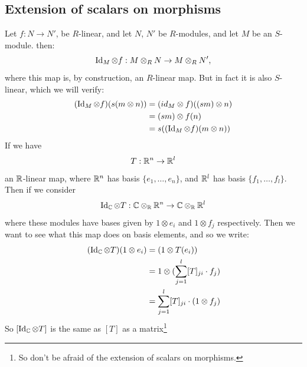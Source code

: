 \documentclass{article}
\begin{document}
\subsection{Extension of scalars on morphisms}
Let $f:N \to N'$, be $R$-linear, and let $N$, $N'$ be $R$-modules, and let $M$ be an $S$-module. then: \[ \operatorname{Id}_{M} \otimes f : M \otimes_{R} N \to M \otimes_{R} N', \] where this map is, by construction, an $R$-linear map. But in fact it is also $S$-linear, which we will verify:
\begin{align*}
    (\operatorname{Id}_{M} \otimes f)(s(m \otimes n)) &= (id_{M} \otimes f)((sm) \otimes n)\\
    &= (sm) \otimes f(n)\\
    &= s((\operatorname{Id}_{M} \otimes f)(m \otimes n))
\end{align*}
If we have \[ T: \mathbb{R}^{n} \to \mathbb{R}^{l}\] an $\mathbb{R}$-linear map, where $\mathbb{R}^{n}$ has basis $\{ e_{1}, \dots, e_{n}\}$, and $\mathbb{R}^{l}$ has basis $\{f_{1}, \dots, f_{l} \}$. Then if we consider \[ \operatorname{Id}_{\mathbb{C}} \otimes T : \mathbb{C} \otimes_{\mathbb{R}} \mathbb{R}^{n} \to \mathbb{C} \otimes_{\mathbb{R}} \mathbb{R}^{l}\] where these modules have bases given by $1 \otimes e_{i}$ and $1 \otimes f_{j}$ respectively. Then we want to see what this map does on basis elements, and so we write: \begin{align*} 
    (\operatorname{Id}_{\mathbb{C}} \otimes T)(1 \otimes e_{i}) &= (1 \otimes T(e_{i}))\\
    &= 1 \otimes (\sum_{j=1}^{l} [T]_{ji}\cdot f_{j})\\
    &= \sum_{j=1}^{l}[T]_{ji} \cdot (1 \otimes f_{j})
\end{align*}
So $[\operatorname{Id}_{\mathbb{C}} \otimes T]$ is the same as $[T]$ as a matrix\footnote{So don't be afraid of the extension of scalars on morphisms.}
\end{document}
